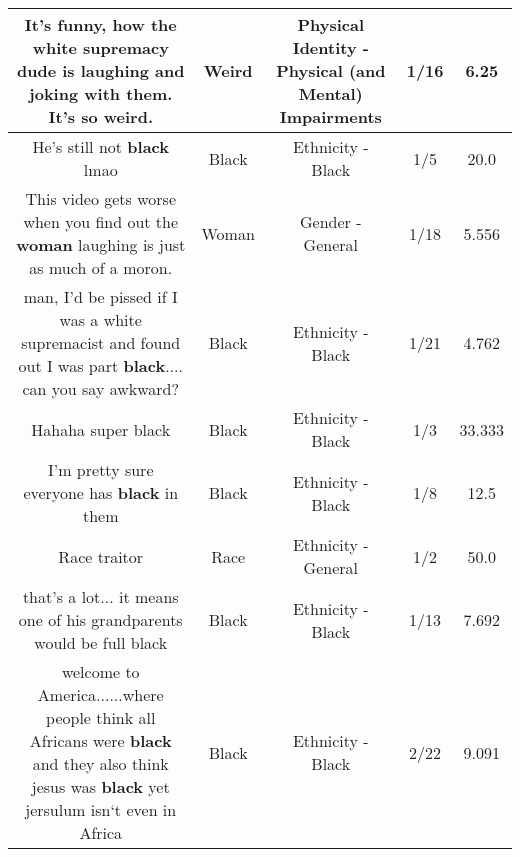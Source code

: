 \documentclass[11pt]{article}
\newlength\mylength
\begin{document}
\begin{center}
\begin{longtable}{|C{.65\mylength}|C{.30\mylength}|C{.12\mylength}|C{.12\mylength}|C{.12\mylength}|}
  \small It's funny, how the white supremacy dude is laughing and joking with them. It's so \textbf{weird}.\normalsize   & Weird & Physical Identity - Physical (and Mental) Impairments & 1/16 & 6.25 \\  \hline
  \small He's still not \textbf{black} lmao\normalsize   & Black & Ethnicity - Black & 1/5 & 20.0 \\  \hline
  \small This video gets worse when you find out the \textbf{woman} laughing is just as much of a moron.\normalsize   & Woman & Gender - General & 1/18 & 5.556 \\  \hline
  \small man, I'd be pissed if I was a white supremacist and found out I was part \textbf{black}.... can you say awkward?\normalsize   & Black & Ethnicity - Black & 1/21 & 4.762 \\  \hline
  \small Hahaha super black\normalsize   & Black & Ethnicity - Black & 1/3 & 33.333 \\  \hline
  \small I'm pretty sure everyone has \textbf{black} in them\normalsize   & Black & Ethnicity - Black & 1/8 & 12.5 \\  \hline
  \small Race traitor\normalsize   & Race & Ethnicity - General & 1/2 & 50.0 \\  \hline
  \small that's a lot... it means one of his grandparents would be full black\normalsize   & Black & Ethnicity - Black & 1/13 & 7.692 \\  \hline
  \small welcome to America......where people think all Africans were \textbf{black} and they also think jesus was \textbf{black} yet jersulum isn`t even in Africa\normalsize   & Black & Ethnicity - Black & 2/22 & 9.091 \\  \hline

\end{longtable}
\end{center}
\end{document}
